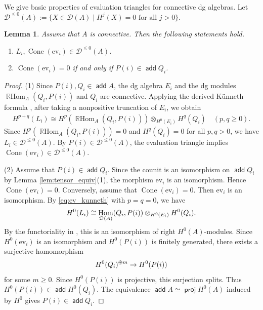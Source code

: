 \documentclass[a4paper,reqno,11pt]{amsart}
\numberwithin{equation}{section}
\newtheorem{lemma}[theorem]{Lemma}
\theoremstyle{definition}
\newcommand{\D}{\mathcal{D}}
\newcommand{\ev}{\mathrm{ev}}
\DeclareMathOperator{\Co}{Cone}
\DeclareMathOperator{\proj}{\mathsf{proj}}
\DeclareMathOperator{\add}{\mathsf{add}}
\DeclareMathOperator{\Hom}{Hom}
\DeclareMathOperator{\RHom}{\mathbb{R}Hom}
\begin{document}
We give basic properties of evaluation triangles for connective dg algebras.
Let $\D^{\leq 0}(A):=\{X\in\D(A)\mid H^{j}(X)=0\text{ for all }j>0\}$.

\begin{lemma}\label{lem:ev_basic}
Assume that $A$ is connective.
Then the following statements hold.
\begin{enumerate}
\item $L_{i},\Co(\ev_{i})\in\D^{\leq 0}(A)$.
\item $\Co(\ev_{i})=0$ if and only if $P(i)\in\add Q_{i}$.
\end{enumerate}
\end{lemma}
\begin{proof}
(1) Since $P(i),Q_{i}\in\add A$, the dg algebra $E_{i}$ and the dg modules $\RHom_{A}(Q_{i},P(i))$ and $Q_{i}$ are connective.
Applying the derived K\"unneth formula \cite[Theorem 7]{Y23}, after taking a nonpositive truncation of $E_{i}$, we obtain
\begin{align}
H^{p+q}(L_{i}) \cong H^{p}(\RHom_{A}(Q_{i},P(i))) \otimes_{H^{0}(E_{i})}H^{q}(Q_{i}) \quad(p,q\geq 0).
\label{eq:ev_kunneth}
\end{align}
Since $H^{p}(\RHom_{A}(Q_{i},P(i)))=0$ and $H^{q}(Q_{i})=0$ for all $p,q>0$, we have $L_{i}\in\D^{\leq 0}(A)$.
By $P(i)\in\D^{\leq 0}(A)$, the evaluation triangle implies $\Co(\ev_{i})\in\D^{\leq 0}(A)$.

(2) Assume that $P(i)\in\add Q_{i}$.
Since the counit is an isomorphism on $\add Q_{i}$ by Lemma \ref{lem:tensor_equiv}(1), the morphism $\ev_{i}$ is an isomorphism.
Hence $\Co(\ev_{i})=0$.
Conversely, assume that $\Co(\ev_{i})=0$.
Then $\ev_{i}$ is an isomorphism.
By \eqref{eq:ev_kunneth} with $p=q=0$, we have
\begin{align}
H^{0}(L_{i})\cong \Hom_{\D(A)}(Q_{i},P(i)) \otimes_{H^{0}(E_{i})}H^{0}(Q_{i}).\notag
\end{align}
By the functoriality in \cite[Theorem 7]{Y23}, this is an isomorphism of right $H^{0}(A)$-modules.
Since $H^{0}(\ev_{i})$ is an isomorphism and $H^{0}(P(i))$ is finitely generated, there exists a surjective homomorphism
\begin{align}
H^{0}(Q_{i})^{\oplus m}\to H^{0}(P(i)) \notag
\end{align}
for some $m\geq 0$.
Since $H^{0}(P(i))$ is projective, this surjection splits.
Thus $H^{0}(P(i))\in\add H^{0}(Q_{i})$.
The equivalence $\add A\simeq\proj H^{0}(A)$ induced by $H^{0}$ gives $P(i)\in\add Q_{i}$.
\end{proof}
\end{document}
